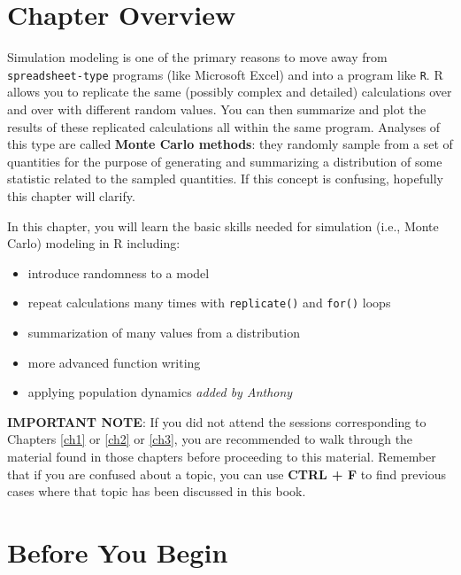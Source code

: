 \documentclass[]{book}
\providecommand{\tightlist}{%
  \setlength{\itemsep}{0pt}\setlength{\parskip}{0pt}}
\begin{document}
\hypertarget{chapter-overview}{%
\section*{Chapter Overview}\label{chapter-overview}}

Simulation modeling is one of the primary reasons to move away from \texttt{spreadsheet-type} programs (like Microsoft Excel) and into a program like \texttt{R}. R allows you to replicate the same (possibly complex and detailed) calculations over and over with different random values. You can then summarize and plot the results of these replicated calculations all within the same program. Analyses of this type are called \textbf{Monte Carlo methods}: they randomly sample from a set of quantities for the purpose of generating and summarizing a distribution of some statistic related to the sampled quantities. If this concept is confusing, hopefully this chapter will clarify.

In this chapter, you will learn the basic skills needed for simulation (i.e., Monte Carlo) modeling in R including:

\begin{itemize}
\tightlist
\item
  introduce randomness to a model
\item
  repeat calculations many times with \texttt{replicate()} and \texttt{for()} loops
\item
  summarization of many values from a distribution
\item
  more advanced function writing
\item
  applying population dynamics \emph{added by Anthony}
\end{itemize}

\textbf{IMPORTANT NOTE}: If you did not attend the sessions corresponding to Chapters \ref{ch1} or \ref{ch2} or \ref{ch3}, you are recommended to walk through the material found in those chapters before proceeding to this material. Remember that if you are confused about a topic, you can use \textbf{CTRL + F} to find previous cases where that topic has been discussed in this book.

\hypertarget{before-you-begin}{%
\section*{Before You Begin}\label{before-you-begin}}
\end{document}
